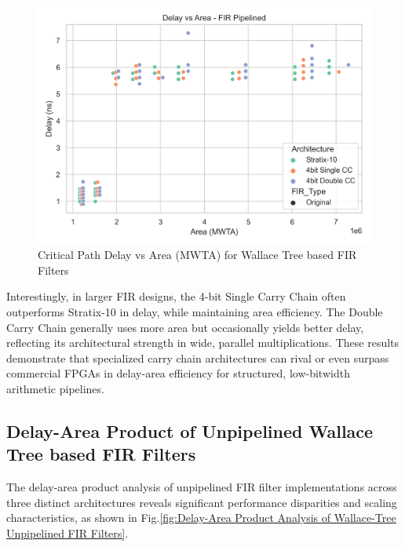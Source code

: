 \begin{figure}[H]
	\centerline{\includegraphics[scale = 0.75]{Figures/fir_pipelined_wallace_delay_area_plt.png}}
	\caption{Critical Path Delay vs Area (MWTA) for Wallace Tree based FIR Filters}
	\label{fig:Critical Path Delay vs Area (MWTA) for Wallace Tree based FIR Filters}
\end{figure}

Interestingly, in larger FIR designs, the 4-bit Single Carry Chain often outperforms Stratix-10 in delay, while maintaining area efficiency. The Double Carry Chain generally uses more area but occasionally yields better delay, reflecting its architectural strength in wide, parallel multiplications. These results demonstrate that specialized carry chain architectures can rival or even surpass commercial FPGAs in delay-area efficiency for structured, low-bitwidth arithmetic pipelines.

\subsection{Delay-Area Product of Unpipelined Wallace Tree based FIR Filters}
The delay-area product analysis of unpipelined FIR filter implementations across three distinct architectures reveals significant performance disparities and scaling characteristics, as shown in Fig.\ref{fig:Delay-Area Product Analysis of Wallace-Tree Unpipelined FIR Filters}.

